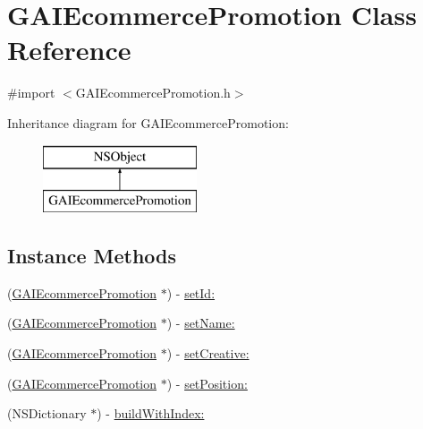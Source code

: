 \hypertarget{interface_g_a_i_ecommerce_promotion}{}\section{G\+A\+I\+Ecommerce\+Promotion Class Reference}
\label{interface_g_a_i_ecommerce_promotion}


{\ttfamily \#import $<$G\+A\+I\+Ecommerce\+Promotion.\+h$>$}

Inheritance diagram for G\+A\+I\+Ecommerce\+Promotion\+:\begin{figure}[H]
\begin{center}
\leavevmode
\includegraphics[height=2.000000cm]{interface_g_a_i_ecommerce_promotion}
\end{center}
\end{figure}
\subsection*{Instance Methods}
\begin{DoxyCompactItemize}
\item 
(\hyperlink{interface_g_a_i_ecommerce_promotion}{G\+A\+I\+Ecommerce\+Promotion} $\ast$) -\/ \hyperlink{interface_g_a_i_ecommerce_promotion_a2fefc7d8bee1f757c3e557678c409fcf}{set\+Id\+:}
\item 
(\hyperlink{interface_g_a_i_ecommerce_promotion}{G\+A\+I\+Ecommerce\+Promotion} $\ast$) -\/ \hyperlink{interface_g_a_i_ecommerce_promotion_af4f2977a6b4cacb60af22f2ded88ec5c}{set\+Name\+:}
\item 
(\hyperlink{interface_g_a_i_ecommerce_promotion}{G\+A\+I\+Ecommerce\+Promotion} $\ast$) -\/ \hyperlink{interface_g_a_i_ecommerce_promotion_aec0c45811511765ec3a1dbd2c50bc91c}{set\+Creative\+:}
\item 
(\hyperlink{interface_g_a_i_ecommerce_promotion}{G\+A\+I\+Ecommerce\+Promotion} $\ast$) -\/ \hyperlink{interface_g_a_i_ecommerce_promotion_a4c5b7f359ac00a6f2438fb40bd98cc30}{set\+Position\+:}
\item 
(N\+S\+Dictionary $\ast$) -\/ \hyperlink{interface_g_a_i_ecommerce_promotion_a284b242448537df1f38fea7f8833f057}{build\+With\+Index\+:}
\end{DoxyCompactItemize}


